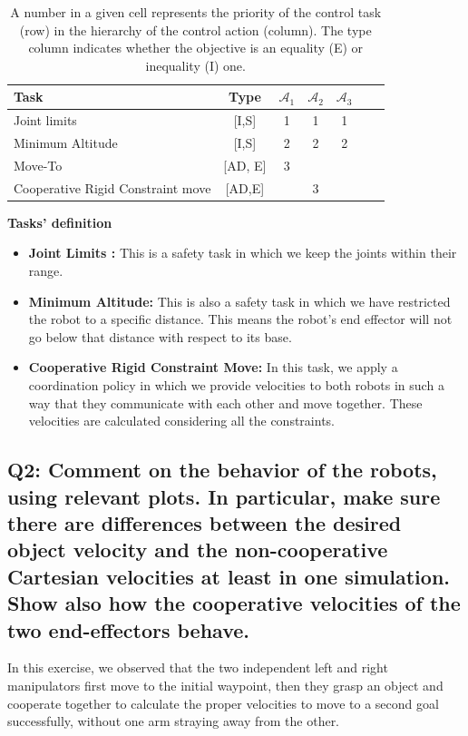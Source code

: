 \documentclass{article}
\begin{document}
\begin{table}[htb]
	\label {tbl:actions_tables}
	\begin{center}
		\footnotesize
		\begin{tabular}{lcccccc}
			\toprule		
			Task & Type & $\mathcal{A}_{1}$ & $\mathcal{A}_{2}$  & $\mathcal{A}_{3}$  \\
			\midrule
			Joint limits                      & [I,S] & 1 & 1 &  1\\
			\hdashline
			Minimum Altitude						&[I,S] & 2& 2 & 2\\
			\hdashline 
			Move-To					&[AD, E] &3 & & \\
			\hdashline 
			Cooperative Rigid Constraint move					& [AD,E] & & 3 & \\
			
			\bottomrule
		\end{tabular}
	\end{center}
	\caption{A number in a given cell represents the priority of the control task (row) in the hierarchy of the control action (column). The type column indicates whether the objective is an equality (E) or inequality (I) one.}
\end{table}

\noindent
\textbf{Tasks' definition}
\begin{itemize}
	\item \textbf{Joint Limits :} This is a safety task in which we keep the joints within their range.
	\item \textbf{Minimum Altitude:} This is also a safety task in which we have restricted the robot to a specific distance. This means the robot's end effector will not go below that distance with respect to its base. 
	\item \textbf{Cooperative Rigid Constraint Move:} In this task, we apply a coordination policy in which we provide velocities to both robots in such a way that they communicate with each other and move together. These velocities are calculated considering all the constraints.
\end{itemize}
\subsection{Q2: Comment on the behavior of the robots, using relevant plots. In particular, make sure there are differences between the desired object velocity and the non-cooperative Cartesian velocities at least in one simulation. Show also how the cooperative velocities of the two end-effectors behave.}
In this exercise, we observed that the two independent left and right manipulators first move to the initial waypoint, then they grasp an object and cooperate together to calculate the proper velocities to move to a second goal successfully, without one arm straying away from the other.\\
\end{document}

